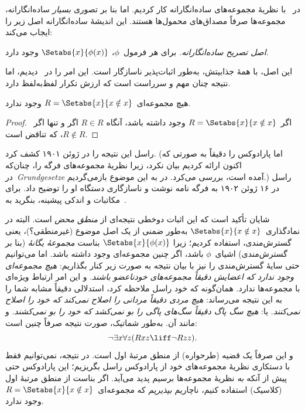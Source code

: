 \documentclass[../../../include/open-logic-section]{subfiles}
\begin{document}

در~ با نظریهٔ مجموعه‌های ساده‌انگارانه کار کردیم.
اما بنا بر تصوری \emph{بسیار} ساده‌انگارانه، مجموعه‌ها صرفاً مصداق‌های
محمول‌ها هستند. این اندیشهٔ ساده‌انگارانه اصل زیر را ایجاب می‌کند:

\begin{defish}
  \emph{اصل تصریح ساده‌انگارانه.} برای هر فرمول~$\phi$،
  $\Setabs{x}{\phi(x)}$ وجود دارد.
\end{defish}

این اصل، با همهٔ جذابیتش، به‌طور اثبات‌پذیر ناسازگار است. این امر را
در~ دیدیم، اما نتیجه چنان مهم و سرراست است
که ارزش تکرار لفظ‌به‌لفظ دارد.

\begin{thm}
هیچ مجموعه‌ای~$R = \Setabs{x}{x \notin x}$ وجود ندارد.
\end{thm}

\begin{proof}
اگر~$R = \Setabs{x}{x \notin x}$ وجود داشته باشد، آنگاه
$R \in R$ اگر و تنها اگر~$R \notin R$، که تناقض است.
\end{proof}

راسل این نتیجه را در ژوئن ۱۹۰۱ کشف کرد. (اما پارادوکس را دقیقاً به
صورتی که اکنون ارائه کردیم بیان نکرد، زیرا نظریهٔ مجموعه‌های فرگه را،
چنان‌که در~\emph{Grundgesetze} آمده است، بررسی می‌کرد. در
 به این موضوع بازمی‌گردیم.) راسل در ۱۶ ژوئن ۱۹۰۲ به
فرگه نامه نوشت و ناسازگاری دستگاه او را توضیح داد. برای مکاتبات و اندکی
پیشینه، بنگرید به~\citet[pp.~124--8]{Heijenoort1967}.

شایان تأکید است که این اثبات دوخطی نتیجه‌ای از \emph{منطق محض} است.
البته در نمادگذاری~$\Setabs{x}{x \notin x}$ به‌طور ضمنی از یک اصل موضوع
(غیرمنطقی؟)، یعنی گسترش‌مندی، استفاده کردیم؛ زیرا
$\Setabs{x}{\phi(x)}$ بناست \emph{مجموعهٔ یگانهٔ} (بنا بر گسترش‌مندی)
اشیای~$\phi$ باشد، اگر چنین مجموعه‌ای وجود داشته باشد. اما می‌توانیم
حتی سایهٔ گسترش‌مندی را نیز با بیان نتیجه به صورت زیر کنار بگذاریم:
\emph{هیچ مجموعه‌ای وجود ندارد که اعضایش دقیقاً مجموعه‌های خودناعضو
باشند}. و این امر ارتباط ویژه‌ای با مجموعه‌ها ندارد. همان‌گونه که خود
راسل ملاحظه کرد، استدلالی دقیقاً مشابه شما را به این نتیجه می‌رساند:
\emph{هیچ مردی دقیقاً مردانی را اصلاح نمی‌کند که خود را اصلاح نمی‌کنند}.
یا: \emph{هیچ سگ پاگ دقیقاً سگ‌های پاگی را بو نمی‌کشد که خود را بو
نمی‌کشند}. و مانند آن. به‌طور شماتیک، صورت نتیجه صرفاً چنین است:
\[
\lnot \exists x \forall z(Rxz \liff \lnot Rzz).
\]
و این صرفاً یک قضیه (طرحواره) از منطق مرتبهٔ اول است. در نتیجه،
نمی‌توانیم فقط با دستکاری نظریهٔ مجموعه‌های خود از پارادوکس راسل
بگریزیم؛ این پارادوکس حتی پیش از آنکه \emph{به} نظریهٔ مجموعه‌ها برسیم
پدید می‌آید. اگر بناست از منطق مرتبهٔ اول (کلاسیک) استفاده کنیم، ناچاریم
\emph{بپذیریم} که مجموعه‌ای~$R = \Setabs{x}{x\notin x}$ وجود ندارد.
\end{document}
